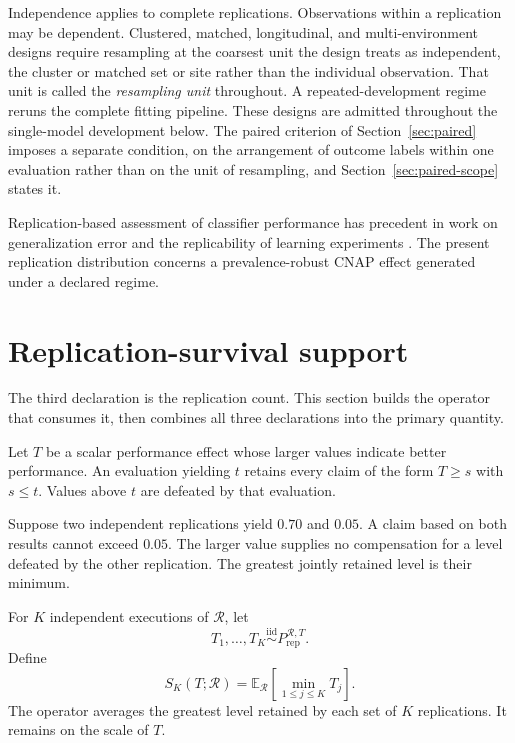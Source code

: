 \documentclass[11pt]{article}
\newcommand{\Regime}{\mathcal{R}}
\newcommand{\E}{\mathbb{E}}
\newcommand{\iid}{\mathrel{\overset{\mathrm{iid}}{\sim}}}
\theoremstyle{remark}
\begin{document}
Independence applies to complete replications. Observations within a replication may be dependent. Clustered, matched, longitudinal, and multi-environment designs require resampling at the coarsest unit the design treats as independent, the cluster or matched set or site rather than the individual observation. That unit is called the \emph{resampling unit} throughout. A repeated-development regime reruns the complete fitting pipeline. These designs are admitted throughout the single-model development below. The paired criterion of Section~\ref{sec:paired} imposes a separate condition, on the arrangement of outcome labels within one evaluation rather than on the unit of resampling, and Section~\ref{sec:paired-scope} states it.

Replication-based assessment of classifier performance has precedent in work on generalization error and the replicability of learning experiments \cite{nadeau2003inference,bouckaert2004estimating}. The present replication distribution concerns a prevalence-robust CNAP effect generated under a declared regime.

\section{Replication-survival support}
\label{sec:support}

The third declaration is the replication count. This section builds the operator that consumes it, then combines all three declarations into the primary quantity.

Let $T$ be a scalar performance effect whose larger values indicate better performance. An evaluation yielding $t$ retains every claim of the form $T\geq s$ with $s\leq t$. Values above $t$ are defeated by that evaluation.

Suppose two independent replications yield $0.70$ and $0.05$. A claim based on both results cannot exceed $0.05$. The larger value supplies no compensation for a level defeated by the other replication. The greatest jointly retained level is their minimum.

For $K$ independent executions of $\Regime$, let
\[
T_1,\ldots,T_K
\iid
P_{\mathrm{rep}}^{\Regime,T}.
\]
Define
\begin{equation}
S_K(T;\Regime)
=
\E_{\Regime}
\left[
\min_{1\leq j\leq K}T_j
\right].
\label{eq:support-operator}
\end{equation}
The operator averages the greatest level retained by each set of $K$ replications. It remains on the scale of $T$.
\end{document}
